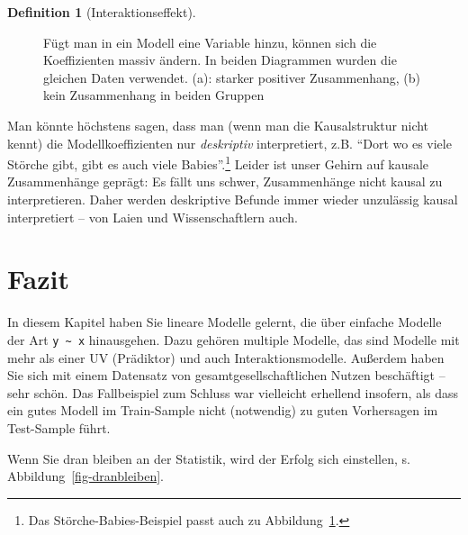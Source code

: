 \documentclass[
  letterpaper,
]{scrbook}
\theoremstyle{definition}
\theoremstyle{definition}
\theoremstyle{definition}
\newtheorem{definition}{Definition}[chapter]
\theoremstyle{remark}
\begin{document}
\begin{definition}[Interaktionseffekt]
\begin{figure}
\begin{minipage}{0.45\linewidth}
{}


\end{minipage}%

\caption{\label{fig-confounder}Fügt man in ein Modell eine Variable
hinzu, können sich die Koeffizienten massiv ändern. In beiden Diagrammen
wurden die gleichen Daten verwendet. (a): starker positiver
Zusammenhang, (b) kein Zusammenhang in beiden Gruppen}

\end{figure}%

Man könnte höchstens sagen, dass man (wenn man die Kausalstruktur nicht
kennt) die Modellkoeffizienten nur \emph{deskriptiv} interpretiert, z.B.
\enquote{Dort wo es viele Störche gibt, gibt es auch viele
Babies}.\footnote{Das Störche-Babies-Beispiel passt auch zu
  Abbildung~\ref{fig-confounder}.} Leider ist unser Gehirn auf kausale
Zusammenhänge geprägt: Es fällt uns schwer, Zusammenhänge nicht kausal
zu interpretieren. Daher werden deskriptive Befunde immer wieder
unzulässig kausal interpretiert -- von Laien und Wissenschaftlern auch.

\section{Fazit}\label{fazit-4}

In diesem Kapitel haben Sie lineare Modelle gelernt, die über einfache
Modelle der Art \texttt{y\ \textasciitilde{}\ x} hinausgehen. Dazu
gehören multiple Modelle, das sind Modelle mit mehr als einer UV
(Prädiktor) und auch Interaktionsmodelle. Außerdem haben Sie sich mit
einem Datensatz von gesamtgesellschaftlichen Nutzen beschäftigt -- sehr
schön. Das Fallbeispiel zum Schluss war vielleicht erhellend insofern,
als dass ein gutes Modell im Train-Sample nicht (notwendig) zu guten
Vorhersagen im Test-Sample führt.

Wenn Sie dran bleiben an der Statistik, wird der Erfolg sich einstellen,
s. Abbildung~\ref{fig-dranbleiben}.

\begin{figure}

\begin{minipage}{0.50\linewidth}

\centering{

}
\end{minipage}
\end{figure}
\end{definition}
\end{document}
